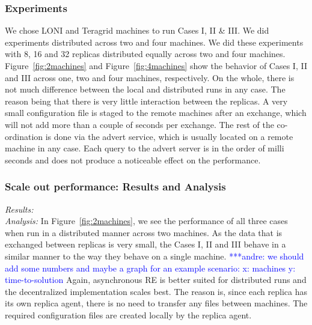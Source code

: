 \documentclass{rspublic}
\newcommand{\alnote}[1]{ {\textcolor{blue} { ***andre: #1 }}}
\newcommand{\alnote}[1]{}
\begin{document}
\subsubsection{Experiments}
We chose LONI and Teragrid machines to run Cases I, II \& III. We did experiments distributed across two and four machines. We did these experiments with 8, 16 and 32 replicas distributed equally across two and four machines. 
Figure~\ref{fig:2machines} and Figure~\ref{fig:4machines} show the behavior of Cases I, II and III across one, two and four machines, respectively. On the whole, there is not much difference between the local and distributed runs in any case. The reason being that there is very little interaction between the replicas. A very small configuration file is staged to the remote machines after an exchange, which will not add more than a couple of seconds per exchange. The rest of the co-ordination is done via the advert service, which is usually located on a remote machine in any case. Each query to the advert server is in the order of milli seconds and does not produce a noticeable effect on the performance. 

\subsubsection{Scale out performance: Results and Analysis}

{\it Results:}\\


{\it Analysis: } In Figure~\ref{fig:2machines}, we see the performance of all three cases when run in a distributed manner across two machines. As the data that is exchanged between replicas is very small, the Cases I, II and III behave in a similar manner to the way they behave on a single machine. \alnote{we should add some numbers and maybe a graph for an example scenario: x: machines y: time-to-solution} Again, asynchronous RE is better suited for distributed runs and the decentralized implementation scales best. The reason is, since each replica has its own replica agent, there is no need to transfer any files between machines. The required configuration files are created locally by the replica agent.
\end{document}
